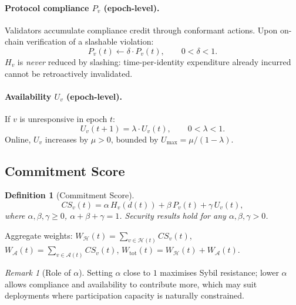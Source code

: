 \documentclass[10pt,journal,twoside]{IEEEtran}
\newtheorem{definition}[theorem]{Definition}
\theoremstyle{remark}
\newtheorem{remark}{Remark}[section]
\newcommand{\CS}{\mathit{CS}}
\begin{document}
	\paragraph{Protocol compliance $P_v$ (epoch-level).}
	Validators accumulate compliance credit through conformant
	actions.
	Upon on-chain verification of a slashable violation:
	\begin{equation}
		\label{eq:pupdate}
		P_v(t) \leftarrow \delta \cdot P_v(t),
		\qquad 0 < \delta < 1.
	\end{equation}
	$H_v$ is \emph{never} reduced by slashing: time-per-identity
	expenditure already incurred cannot be retroactively
	invalidated.
	
	\paragraph{Availability $U_v$ (epoch-level).}
	If $v$ is unresponsive in epoch $t$:
	\begin{equation}
		\label{eq:uoffline}
		U_v(t+1) = \lambda \cdot U_v(t),
		\qquad 0 < \lambda < 1.
	\end{equation}
	Online, $U_v$ increases by $\mu > 0$, bounded by
	$U_{\max} = \mu / (1 - \lambda)$.
	
	\subsection{Commitment Score}
	\label{ssec:cscoredef}
	\vspace{-2pt}
	
	\begin{definition}[Commitment Score]
		\label{def:cscore}
		\begin{equation}
			\label{eq:cscore}
			\CS_v(t) = \alpha\, H_v(d(t))
			+ \beta\, P_v(t)
			+ \gamma\, U_v(t),
		\end{equation}
		where $\alpha, \beta, \gamma \geq 0$,
		$\alpha + \beta + \gamma = 1$.
		Security results hold for any $\alpha, \beta, \gamma > 0$.
	\end{definition}
	
	Aggregate weights:
	$W_{\mathcal{H}}(t) = \sum_{v \in \mathcal{H}(t)} \CS_v(t)$,
	$W_{\mathcal{A}}(t) = \sum_{v \in \mathcal{A}(t)} \CS_v(t)$,
	$W_{\mathrm{tot}}(t) = W_{\mathcal{H}}(t) +
	W_{\mathcal{A}}(t)$.
	
	\begin{remark}[Role of $\alpha$]
		\label{rem:alpha}
		Setting $\alpha$ close to $1$ maximises Sybil resistance;
		lower $\alpha$ allows compliance and availability to
		contribute more, which may suit deployments where
		participation capacity is naturally constrained.
	\end{remark}
	
\end{document}
